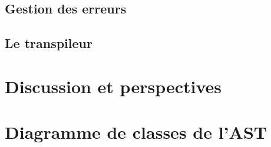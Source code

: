 \documentclass[a4paper]{article}%
\begin{document}
\subsection{Gestion des erreurs}

\subsection{Le transpileur}

\section{Discussion et perspectives}

\pagestyle{empty}
\clearpage{}
\printbibliography[keyword={paper},title={Biliographie}]
\printbibliography[keyword={web},title={Webographie}]

\clearpage
\printglossaries

\appendix

\clearpage{}
\section{Diagramme de classes de l'AST}\label{appendix:classAST}

\begin{figure}[h]
  \begin{center}
  \end{center}
\end{figure}
\end{document}
